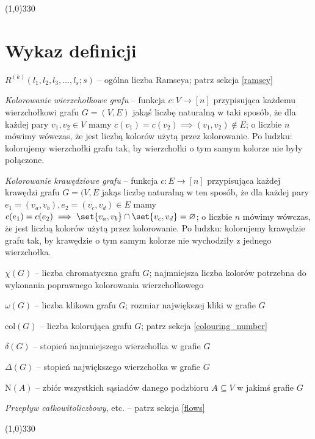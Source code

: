 \line(1,0){330} \\ 

\section*{Wykaz definicji}

\vspace{2pt}

\(R^{(k)}(l_1,l_2,l_3,\dots,l_s;s)\) -- ogólna liczba Ramseya; patrz sekcja \ref{ramsey} 

\textit{Kolorowanie wierzchołkowe grafu} -- funkcja \(c: V \rightarrow [n]\) przypisująca każdemu wierzchołkowi grafu \(G = (V, E)\) jakąś liczbę naturalną w taki sposób, że dla każdej pary \(v_1, v_2 \in V\) mamy \(  c(v_1) = c(v_2) \implies (v_1, v_2) \not\in E\); o liczbie \(n\) mówimy wówczas, że jest liczbą kolorów użytą przez kolorowanie. Po ludzku: kolorujemy wierzchołki grafu tak, by wierzchołki o tym samym kolorze nie były połączone.

\textit{Kolorowanie krawędziowe grafu} -- funkcja \(c: E \rightarrow [n]\) przypisująca każdej krawędzi grafu \(G = (V,E\) jakąs liczbę naturalną w ten sposób, że dla każdej pary \(e_1 = (v_a, v_b), e_2 = (v_c, v_d) \in E\) mamy \(c(e_1) = c(e_2) \implies \set{v_a,v_b} \cap \set{v_c, v_d} = \varnothing \); o liczbie \(n\) mówimy wówczas, że jest liczbą kolorów użytą przez kolorowanie. Po ludzku: kolorujemy krawędzie grafu tak, by krawędzie o tym samym kolorze nie wychodziły z jednego wierzchołka. 

\( \chi(G) \) -- liczba chromatyczna grafu \(G\); najmniejsza liczba kolorów potrzebna do wykonania poprawnego kolorowania wierzchołkowego

\(\omega(G)\) -- liczba klikowa grafu \(G\); rozmiar największej kliki w grafie \(G\)

\(\mathrm{col}(G)\) -- liczba kolorująca grafu \(G\); patrz sekcja \ref{colouring_number}

\(\delta(G)\) -- stopień najmniejszego wierzchołka w grafie \(G\)

\(\Delta(G)\) -- stopień największego wierzchołka w grafie \(G\)

\(\mathrm{N}(A)\) -- zbiór wszystkich sąsiadów danego podzbioru \( A \subseteq V\) w jakimś grafie \(G\)

\textit{Przepływ całkowitoliczbowy}, etc. -- patrz sekcja \ref{flows}

\vspace{2pt}

\line(1,0){330}

